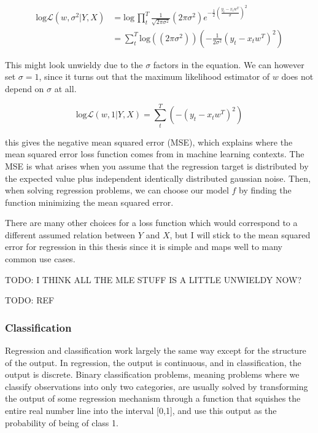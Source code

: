 \begin{align}
  \text{log} \mathcal L(w,\sigma^2 | Y,X) &= \text{log}\, \prod_t^T \frac{1}{\sqrt{2 \pi \sigma^2}}(2 \pi \sigma^2 )e^{-\frac 1 2 (\frac {y_t - x_t w^T}{\sigma})^2} \\
  &= \sum_t^T \text{log}((2 \pi \sigma^2 )) (-\frac{1}{2 \sigma^2} (y_t - x_t w^T)^2)
\end{align}

This might look unwieldy due to the $\sigma$ factors in the equation. We can
however set $\sigma=1$, since it turns out that the maximum likelihood
estimator of $w$ does not depend on $\sigma$ at all.

\begin{equation}
  \text{log} \mathcal L(w,1 | Y,X) = \sum_t^T (-(y_t - x_t w^T)^2)
\end{equation}

this gives the negative mean squared error (MSE), which explains where the mean
squared error loss function comes from in machine learning contexts. The MSE is
what arises when you assume that the regression target is distributed by the
expected value plus independent identically distributed gaussian noise. Then,
when solving regression problems, we can choose our model $f$ by finding the
function minimizing the mean squared error.

There are many other choices for a loss function which would correspond to a
different assumed relation between $Y$ and $X$, but I will stick to the mean
squared error for regression in this thesis since it is simple and maps well to
many common use cases.

TODO: I THINK ALL THE MLE STUFF IS A LITTLE UNWIELDY NOW?

TODO: REF

\subsubsection{Classification}

Regression and classification work largely the same way except for the
structure of the output. In regression, the output is continuous, and in
classification, the output is discrete. Binary classification problems, meaning
problems where we classify observations into only two categories, are usually
solved by transforming the output of some regression mechanism through a
function that squishes the entire real number line into the interval [0,1], and
use this output as the probability of being of class 1.

